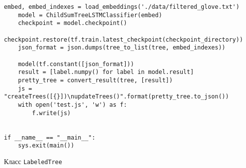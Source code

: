 \begin{lstlisting}[style=app]
    embed, embed_indexes = load_embeddings('./data/filtered_glove.txt')
    model = ChildSumTreeLSTMClassifier(embed)
    checkpoint = model.checkpoint()
    checkpoint.restore(tf.train.latest_checkpoint(checkpoint_directory))
    json_format = json.dumps(tree_to_list(tree, embed_indexes))

    model(tf.constant([json_format]))
    result = [label.numpy() for label in model.result]
    pretty_tree = convert_result(tree, [result])
    js = "createTrees([{}])\nupdateTrees()".format(pretty_tree.to_json())
    with open('test.js', 'w') as f:
        f.write(js)


if __name__ == "__main__":
    sys.exit(main())
\end{lstlisting}


\begin{center}Класс \texttt{LabeledTree}\end{center}

